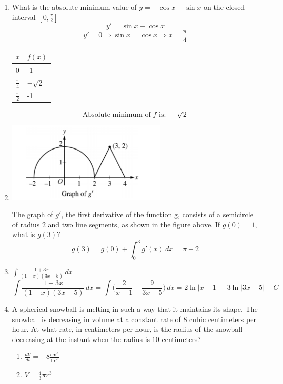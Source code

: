 \documentclass[12pt]{article}
\begin{document}
\begin{enumerate}
\begin{center}
    \end{center}
    \item What is the absolute minimum value of  $y = -\cos x - \sin x$  on the closed interval $[0,\frac{\pi}{2}]$
    $$y'=\sin x-\cos x$$
    $$y'=0 \Longrightarrow \sin x= \cos x \Longrightarrow x=\frac{\pi}{4}$$
    \begin{table}[h]
        \centering
        \begin{tabular}{l|l}
        $x$ & $f(x)$ \\ \hline
        0 & -1 \\ \hline
        $\frac{\pi}{4}$ & $-\sqrt{2}$ \\ \hline
        $\frac{\pi}{2}$ & -1 \\ \hline
        \end{tabular}
        \end{table}
        $$\boxed{\text{Absolute minimum of $f$ is: }  -\sqrt{2}}$$
    \item 
        \begin{center}
            \includegraphics[width=3in]{FEP8.png}
        \end{center}
    The graph of $g'$, the first derivative of the function g, consists of a semicircle of radius $2$ and two line segments, as shown in the figure above. If $g(0) = 1$, what is $g (3)$?
    $$g(3)=g(0)+\int_{0}^{3} g'(x)\, dx = \boxed{\pi + 2}$$
    \item $\int \frac{1+3x}{(1-x)(3x-5)}\,dx = $
    $$\int \frac{1+3x}{(1-x)(3x-5)}\,dx = \int \Bigg( \frac{2}{x-1}-\frac{9}{3x-5}\Biggr) \, dx  = \boxed{2\ln|x-1|-3\ln|3x-5|+C}$$
    \item A spherical snowball is melting in such a way that it maintains its shape. The snowball is decreasing in volume at a constant rate of $8$ cubic centimeters per hour. At what rate, in centimeters per hour, is the radius of the snowball decreasing at the instant when the radius is $10$ centimeters?
    \begin{enumerate}
        \item $\frac{dV}{dt} = -8 \frac{\text{cm}^3}{{\text{hr}^2}}$
        \item $V=\frac{4}{3}\pi r^3$

\end{enumerate}
\end{enumerate}
\end{document}
